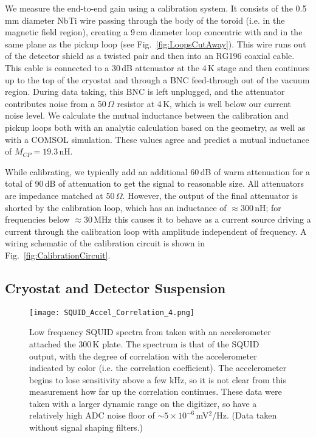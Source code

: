 \documentclass[aps,prd,amsmath,amssymb,reprint,superscriptaddress, nofootinbib,
]{revtex4-1}
\begin{document}
We measure the end-to-end gain using a calibration system. It consists of the 0.5\,mm diameter NbTi wire passing through the body of the toroid (i.e. in the magnetic field region), creating a 9\,cm diameter loop concentric with and in the same plane as the pickup loop (see Fig.~\ref{fig:LoopsCutAway}). This wire runs out of the detector shield as a twisted pair and then into an RG196 coaxial cable. This cable is connected to a 30\,dB attenuator at the 4\,K stage and then continues up to the top of the cryostat and through a BNC feed-through out of the vacuum region. During data taking, this BNC is left unplugged, and the attenuator contributes noise from a 50\,$\Omega$ resistor at 4\,K, which is well below our current noise level. We calculate the mutual inductance between the calibration and pickup loops both with an analytic calculation based on the geometry, as well as with a COMSOL \cite{COMSOL} simulation. These values agree and predict a mutual inductance of $M_{CP}=19.3$\,nH. 

While calibrating, we typically add an additional 60\,dB of warm attenuation for a total of 90\,dB of attenuation to get the signal to reasonable size. All attenuators are impedance matched at 50\,$\Omega$. However, the output of the final attenuator is shorted by the calibration loop, which has an inductance of $\approx$300\,nH; for frequencies below $\approx30$\,MHz this causes it to behave as a current source driving a current through the calibration loop with amplitude independent of frequency. A wiring schematic of the calibration circuit is shown in Fig.~\ref{fig:CalibrationCircuit}.

\subsection{Cryostat and Detector Suspension}
\label{sec:Cryostat}

\begin{figure}
\centering
\texttt{[image: SQUID\_Accel\_Correlation\_4.png]}
\caption{Low frequency SQUID spectra from \abra taken with an accelerometer attached the 300\,K plate. The spectrum is that of the SQUID output, with the degree of correlation with the accelerometer indicated by color (i.e. the correlation coefficient). The accelerometer begins to lose sensitivity above a few kHz, so it is not clear from this measurement how far up the correlation continues. These data were taken with a larger dynamic range on the digitizer, so have a relatively high ADC noise floor of $\sim5\times10^{-6}$\,mV$^2$/Hz. (Data taken without signal shaping filters.)}
\label{fig:SQUIDAccelCorrelation}
\end{figure}
\end{document}
